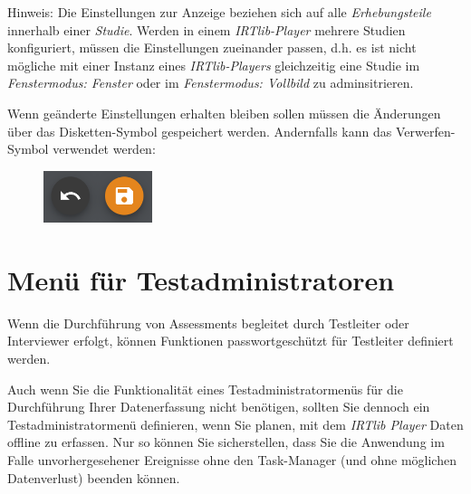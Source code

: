 \documentclass[
  letterpaper,
  DIV=11]{scrreprt}
\begin{document}
\begin{tcolorbox}
Hinweis: Die Einstellungen zur Anzeige beziehen sich auf alle
\emph{Erhebungsteile} innerhalb einer \emph{Studie}. Werden in einem
\emph{IRTlib-Player} mehrere Studien konfiguriert, müssen die
Einstellungen zueinander passen, d.h. es ist nicht mögliche mit einer
Instanz eines \emph{IRTlib-Players} gleichzeitig eine Studie im
\emph{Fenstermodus: Fenster} oder im \emph{Fenstermodus: Vollbild} zu
adminsitrieren.

Wenn geänderte Einstellungen erhalten bleiben sollen müssen die
Änderungen über das Disketten-Symbol gespeichert werden. Andernfalls
kann das Verwerfen-Symbol verwendet werden:

\begin{figure}[H]

\includegraphics[width=1.25in,height=\textheight]{img/screenshot-icons-undo-and-save-01.png} \hfill{}

\end{figure}

\end{tcolorbox}

\hypertarget{menuxfc-fuxfcr-testadministratoren-1}{%
\section{Menü für
Testadministratoren}\label{menuxfc-fuxfcr-testadministratoren-1}}

Wenn die Durchführung von Assessments begleitet durch Testleiter oder
Interviewer erfolgt, können Funktionen passwortgeschützt für Testleiter
definiert werden.

\begin{tcolorbox}[enhanced jigsaw, colbacktitle=quarto-callout-warning-color!10!white, coltitle=black, colframe=quarto-callout-warning-color-frame, leftrule=.75mm, breakable, opacitybacktitle=0.6, toprule=.15mm, title=\textcolor{quarto-callout-warning-color}{\faExclamationTriangle}\hspace{0.5em}{Warnung}, colback=white, titlerule=0mm, arc=.35mm, bottomtitle=1mm, toptitle=1mm, rightrule=.15mm, bottomrule=.15mm, left=2mm, opacityback=0]

Auch wenn Sie die Funktionalität eines Testadministratormenüs für die
Durchführung Ihrer Datenerfassung nicht benötigen, sollten Sie dennoch
ein Testadministratormenü definieren, wenn Sie planen, mit dem
\emph{IRTlib Player} Daten offline zu erfassen. Nur so können Sie
sicherstellen, dass Sie die Anwendung im Falle unvorhergesehener
Ereignisse ohne den Task-Manager (und ohne möglichen Datenverlust)
beenden können.

\end{tcolorbox}
\end{document}
